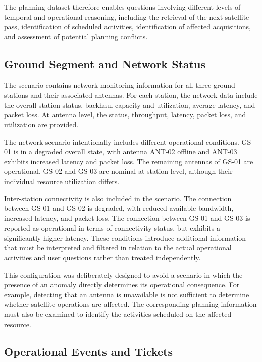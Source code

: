 The planning dataset therefore enables questions involving different levels of temporal and operational reasoning, including the retrieval of the next satellite pass, identification of scheduled activities, identification of affected acquisitions, and assessment of potential planning conflicts.

\subsection{Ground Segment and Network Status}

The scenario contains network monitoring information for all three ground stations and their associated antennas. For each station, the network data include the overall station status, backhaul capacity and utilization, average latency, and packet loss. At antenna level, the status, throughput, latency, packet loss, and utilization are provided.

The network scenario intentionally includes different operational conditions. GS-01 is in a degraded overall state, with antenna ANT-02 offline and ANT-03 exhibits increased latency and packet loss. The remaining antennas of GS-01 are operational. GS-02 and GS-03 are nominal at station level, although their individual resource utilization differs.

Inter-station connectivity is also included in the scenario. The connection between GS-01 and GS-02 is degraded, with reduced available bandwidth, increased latency, and packet loss. The connection between GS-01 and GS-03 is reported as operational in terms of connectivity status, but exhibits a significantly higher latency. These conditions introduce additional information that must be interpreted and filtered in relation to the actual operational activities and user questions rather than treated independently.

This configuration was deliberately designed to avoid a scenario in which the presence of an anomaly directly determines its operational consequence. For example, detecting that an antenna is unavailable is not sufficient to determine whether satellite operations are affected. The corresponding planning information must also be examined to identify the activities scheduled on the affected resource.

\subsection{Operational Events and Tickets}

